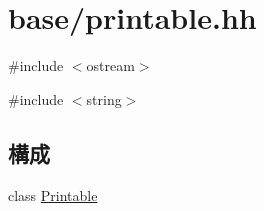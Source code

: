 \hypertarget{printable_8hh}{
\section{base/printable.hh}
\label{printable_8hh}
}
{\ttfamily \#include $<$ostream$>$}\par
{\ttfamily \#include $<$string$>$}\par
\subsection*{構成}
\begin{DoxyCompactItemize}
\item 
class \hyperlink{classPrintable}{Printable}
\end{DoxyCompactItemize}
